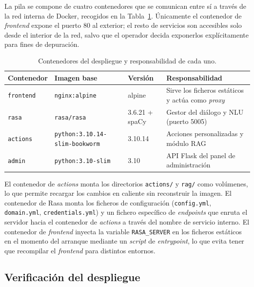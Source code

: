 La pila se compone de cuatro contenedores que se comunican entre sí a través de la red interna de Docker, recogidos en la Tabla~\ref{tab:despliegue-contenedores}. Únicamente el contenedor de \textit{frontend} expone el puerto 80 al exterior; el resto de servicios son accesibles solo desde el interior de la red, salvo que el operador decida exponerlos explícitamente para fines de depuración.

\begin{table}[hbtp]
\centering
\caption{Contenedores del despliegue y responsabilidad de cada uno.}\label{tab:despliegue-contenedores}
\footnotesize
\setlength{\tabcolsep}{4pt}
\begin{tabular}{p{1.7cm}p{3.4cm}p{2.2cm}p{4.8cm}}
\hline
\textbf{Contenedor} & \textbf{Imagen base} & \textbf{Versión} & \textbf{Responsabilidad} \\
\hline
\texttt{frontend} & \texttt{nginx:alpine} & alpine & Sirve los ficheros estáticos y actúa como \textit{proxy} \\
\texttt{rasa} & \texttt{rasa/rasa} & 3.6.21 + spaCy & Gestor del diálogo y NLU (puerto 5005) \\
\texttt{actions} & \texttt{python:3.10.14-} \texttt{slim-bookworm} & 3.10.14 & Acciones personalizadas y módulo RAG \\
\texttt{admin} & \texttt{python:3.10-slim} & 3.10 & API Flask del panel de administración \\
\hline
\end{tabular}
\end{table}

El contenedor de \textit{actions} monta los directorios \texttt{actions/} y \texttt{rag/} como volúmenes, lo que permite recargar los cambios en caliente sin reconstruir la imagen. El contenedor de Rasa monta los ficheros de configuración (\texttt{config.yml}, \texttt{domain.yml}, \texttt{credentials.yml}) y un fichero específico de \textit{endpoints} que enruta el servidor hacia el contenedor de \textit{actions} a través del nombre de servicio interno. El contenedor de \textit{frontend} inyecta la variable \texttt{RASA\_SERVER} en los ficheros estáticos en el momento del arranque mediante un \textit{script} de \textit{entrypoint}, lo que evita tener que recompilar el \textit{frontend} para distintos entornos.

\subsection{Verificación del despliegue}\label{subsec:despliegue-verificacion}

